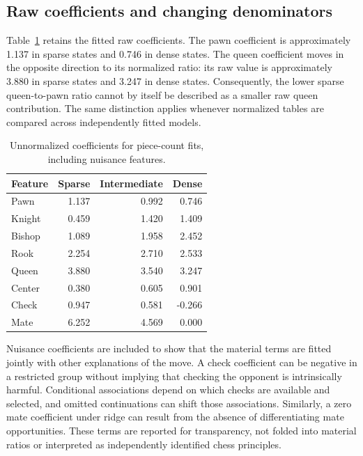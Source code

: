 \documentclass{jcst}
\begin{document}
\subsection{Raw coefficients and changing denominators}
Table~\ref{tab:countraw} retains the fitted raw coefficients. The pawn coefficient is approximately 1.137 in sparse states and 0.746 in dense states. The queen coefficient moves in the opposite direction to its normalized ratio: its raw value is approximately 3.880 in sparse states and 3.247 in dense states. Consequently, the lower sparse queen-to-pawn ratio cannot by itself be described as a smaller raw queen contribution. The same distinction applies whenever normalized tables are compared across independently fitted models.
\begin{table}[tbp]\centering
\small
\caption{Unnormalized coefficients for piece-count fits, including nuisance features.}\label{tab:countraw}
\begin{tabular}{lrrr}
\toprule
Feature & Sparse & Intermediate & Dense\\\midrule
Pawn & 1.137 & 0.992 & 0.746\\
Knight & 0.459 & 1.420 & 1.409\\
Bishop & 1.089 & 1.958 & 2.452\\
Rook & 2.254 & 2.710 & 2.533\\
Queen & 3.880 & 3.540 & 3.247\\
Center & 0.380 & 0.605 & 0.901\\
Check & 0.947 & 0.581 & -0.266\\
Mate & 6.252 & 4.569 & 0.000\\
\bottomrule\end{tabular}\end{table}

Nuisance coefficients are included to show that the material terms are fitted jointly with other explanations of the move. A check coefficient can be negative in a restricted group without implying that checking the opponent is intrinsically harmful. Conditional associations depend on which checks are available and selected, and omitted continuations can shift those associations. Similarly, a zero mate coefficient under ridge can result from the absence of differentiating mate opportunities. These terms are reported for transparency, not folded into material ratios or interpreted as independently identified chess principles.
\end{document}
